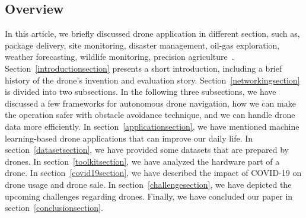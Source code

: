 \subsection*{\textbf{Overview}}
In this article, we briefly discussed drone application in different section, such as, package delivery, site monitoring, disaster management, oil-gas exploration, weather forecasting, wildlife monitoring, precision agriculture~\cite{kucuksubasi2018transfer, kang2018autonomous, wu2018coupling, fan2019real, li2017visual,saribas2019hybrid, zhang2019dense, mayer2019drones,brennan2019drones, bondi2018spot,garcia2018explainable, kyrkou2019deep, tariq2018dronaid, apolo2020deep, fernandez2019towards}.  Section~\ref{introductionsection} presents a short introduction, including a brief history of the drone's invention and evaluation story. Section~\ref{networkingsection} is divided into two subsections. In the following three subsections, we have discussed a few frameworks for autonomous drone navigation, how we can make the operation safer with obstacle avoidance technique, and we can handle drone data more efficiently. 
In section~\ref{applicationsection}, we have mentioned machine learning-based drone applications that can improve our daily life. In section~\ref{datasetsection}, we have provided some datasets that are prepared by drones. In section~\ref{toolkitsection}, we have analyzed the hardware part of a drone. In section~\ref{covid19section}, we have described the impact of COVID-19 on drone usage and drone sale. In section~\ref{challengesection}, we have depicted the upcoming challenges regarding drones. Finally, we have concluded our paper in section~\ref{conclusionsection}.
%
